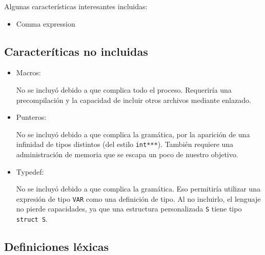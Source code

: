 \documentclass[12pt]{article}
\begin{document}
Algunas caracter\'isticas interesantes incluidas:
\begin{itemize}
    \item Comma expression
\end{itemize}

\subsection*{Caracter\'iticas no incluidas}
\begin{itemize}
    \item Macros:

    No se incluy\'o debido a que complica todo el proceso. Requerir\'ia una precompilaci\'on y la capacidad de incluir otros archivos mediante enlazado.
    \item Punteros:

    No se incluy\'o debido a que complica la gram\'atica, por la aparici\'on de una infinidad de tipos distintos (del estilo \texttt{int***}). Tambi\'en requiere una administraci\'on de memoria que se escapa un poco de nuestro objetivo.

    \item Typedef:

    No se incluy\'o debido a que complica la gram\'atica. Eso permitir\'ia utilizar una expresi\'on de tipo \texttt{VAR} como una definici\'on de tipo. Al no incluirlo, el lenguaje no pierde capacidades, ya que una estructura personalizada \texttt{S} tiene tipo \texttt{struct S}.
\end{itemize}

\subsection*{Definiciones l\'exicas}
\end{document}
